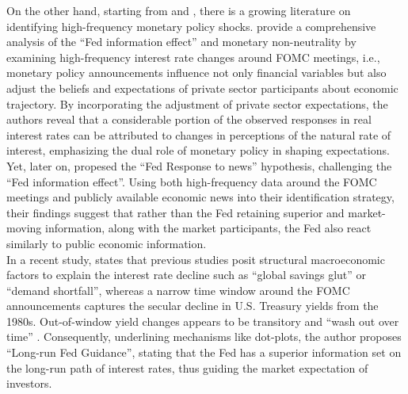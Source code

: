 On the other hand, starting from \citet{romer2004new} and \citet{gurkaynak2005}, there is a growing literature on identifying high-frequency monetary policy shocks. \citet{nakamura2018high} provide a comprehensive analysis of the ``Fed information effect'' and monetary non-neutrality by examining high-frequency interest rate changes around FOMC meetings, i.e., monetary policy announcements influence not only financial variables but also adjust the beliefs and expectations of private sector participants about economic trajectory. By incorporating the adjustment of private sector expectations, the authors reveal that a considerable portion of the observed responses in real interest rates can be attributed to changes in perceptions of the natural rate of interest, emphasizing the dual role of monetary policy in shaping expectations. Yet, later on, \citet{bauer2023alternative} propesed the “Fed Response to news” hypothesis, challenging the “Fed information effect”. Using both high-frequency data around the FOMC meetings and publicly available economic news into their identification strategy, their findings suggest that rather than the Fed retaining superior and market-moving information, along with the market participants, the Fed also react similarly to public economic information. \\

In a recent study, \citet{hillenbrand2022} states that previous studies posit structural macroeconomic factors to explain the interest rate decline such as ``global savings glut'' or ``demand shortfall'', whereas a narrow time window around the FOMC announcements captures the secular decline in U.S. Treasury yields from the 1980s. Out-of-window yield changes appears to be transitory and ``wash out over time'' \citep{hillenbrand2022}. Consequently, underlining mechanisms like dot-plots, the author proposes ``Long-run Fed Guidance'', stating that the Fed has a superior information set on the long-run path of interest rates, thus guiding the market expectation of investors. 

\newpage 

